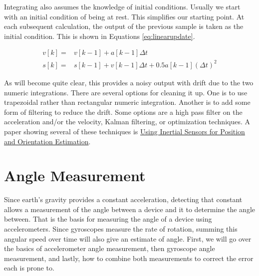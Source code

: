 Integrating also assumes the knowledge of initial conditions. Usually we start with an initial condition of 
being at rest. This simplifies our starting point. At each subsequent calculation, the output of the previous
sample is taken as the initial condition. This is shown in Equations \ref{eq:linearupdate}.

\begin{subequations}
	\label{eq:linearupdate}
	\begin{align}
		v[k] =& v[k-1] + a[k-1]\Delta t \\
		s[k] =& s[k-1] + v[k-1]\Delta t + 0.5a[k-1](\Delta t)^2
	\end{align}
\end{subequations}

As will become quite clear, this provides a noisy output with drift due to the two numeric integrations.
There are several options for cleaning it up. One is to use trapezoidal rather than rectangular
numeric integration. Another is to add some form of filtering to reduce the drift. Some options are
a high pass filter on the acceleration and/or the velocity, Kalman filtering, or optimization techniques.
A paper showing several of these techniques is 
\href{https://arxiv.org/pdf/1704.06053.pdf}{Using Inertial Sensors for Position
and Orientation Estimation}.

\section{Angle Measurement}
Since earth's gravity provides a constant acceleration, detecting that constant allows a measurement of the 
angle between a device and it to determine the angle between. That is the basis for measuring the angle 
of a device using accelerometers. Since gyroscopes measure the rate of rotation, summing this angular
speed over time will also give an estimate of angle. First, we will go over the basics of accelerometer 
angle measurement, then gyroscope angle measurement, and lastly, how to combine both measurements to correct
the error each is prone to. 

